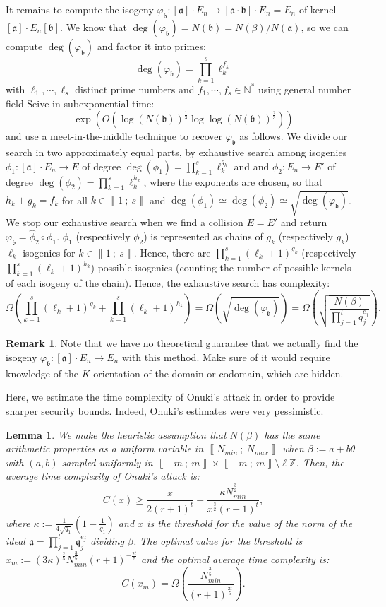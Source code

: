 \documentclass[a4paper,10pt,notitlepage]{report}
\theoremstyle{definition}
\theoremstyle{plain}
\newtheorem{Lemma}[Definition]{Lemma}
\theoremstyle{definition}
\newtheorem{Remark}[Definition]{Remark}
\newcommand{\N}{\mathbb{N}}
\newcommand{\Z}{\mathbb{Z}}
\renewcommand{\i}[2]{\left\llbracket #1~;~#2\right\rrbracket}
\renewcommand{\(}{\left(}
\renewcommand{\)}{\right)}
\newcommand{\mf}[1]{\mathfrak{#1}}
\begin{document}
It remains to compute the isogeny $\varphi_{\mf{b}}:[\mf{a}]\cdot E_n\longrightarrow [\mf{a}\cdot\mf{b}]\cdot E_n=E_n$ of kernel $[\mf{a}]\cdot E_n[\mf{b}]$.  We know that $\deg(\varphi_{\mf{b}})=N(\mf{b})=N(\beta)/N(\mf{a})$, so we can compute $\deg(\varphi_{\mf{b}})$ and factor it into primes:
\[\deg(\varphi_{\mf{b}})=\prod_{k=1}^s\ell_k^{f_k}\]
with $\ell_1,\cdots, \ell_s$ distinct prime numbers and $f_1,\cdots, f_s\in\N^*$ using general number field Seive in subexponential time:
\[\exp\(O\(\log(N(\mf{b}))^{\frac{1}{3}}\log\log(N(\mf{b}))^{\frac{2}{3}}\)\)\] 
and use a meet-in-the-middle technique to recover $\varphi_{\mf{b}}$ as follows. We divide our search in two approximately equal parts, by exhaustive search among isogenies $\phi_1 : [\mf{a}]\cdot E_n\longrightarrow E$ of degree $\deg(\phi_1)=\prod_{k=1}^s\ell_k^{g_k}$ and and $\phi_2 : E_n\longrightarrow E'$ of degree $\deg(\phi_2)=\prod_{k=1}^s\ell_k^{h_k}$, where the exponents are chosen, so that $h_k+g_k=f_k$ for all $k\in\i{1}{s}$ and $\deg(\phi_1)\simeq\deg(\phi_2)\simeq\sqrt{\deg(\varphi_{\mf{b}})}$. We stop our exhaustive search when we find a collision $E=E'$ and return $\varphi_{\mf{b}}=\widehat{\phi}_2\circ\phi_1$. $\phi_1$ (respectively $\phi_2$) is represented as chains of $g_k$ (respectively $g_k$) $\ell_k$-isogenies for $k\in\i{1}{s}$. Hence, there are $\prod_{k=1}^s(\ell_k+1)^{g_k}$ (respectively $\prod_{k=1}^s(\ell_k+1)^{h_k}$) possible isogenies (counting the number of possible kernels of each isogeny of the chain). Hence, the exhaustive search has complexity:
\[\Omega\(\prod_{k=1}^s(\ell_k+1)^{g_k}+\prod_{k=1}^s(\ell_k+1)^{h_k}\)=\Omega(\sqrt{\deg(\varphi_{\mf{b}})})=\Omega\(\sqrt{\frac{N(\beta)}{\prod_{j=1}^t q_j^{e_j}}}\).\]

\begin{Remark}
Note that we have no theoretical guarantee that we actually find the isogeny $\varphi_{\mf{b}}:[\mf{a}]\cdot E_n\longrightarrow E_n$ with this method. Make sure of it would require knowledge of the $K$-orientation of the domain or codomain, which are hidden.
\end{Remark} 

Here, we estimate the time complexity of Onuki's attack in order to provide sharper security bounds. Indeed, Onuki's estimates were very pessimistic.

\begin{Lemma}
We make the heuristic assumption that $N(\beta)$ has the same arithmetic properties as a uniform variable in $\i{N_{min}}{N_{max}}$ when $\beta:=a+b\theta$ with $(a,b)$ sampled uniformly in $\i{-m}{m}\times\i{-m}{m}\setminus\ell\Z$. Then, the average time complexity of Onuki's attack \cite[§ 6.3]{Onuki} is:
\[C(x)\geq \frac{x}{2(r+1)^t}+\frac{\kappa N_{min}^{\frac{3}{2}}}{x^{\frac{3}{2}}(r+1)^t},\]
where $\kappa:=\frac{1}{4\sqrt{q_1}}\(1-\frac{1}{q_1}\)$ and $x$ is the threshold for the value of the norm of the ideal $\mf{a}=\prod_{j=1}^t\mf{q}_j^{e_j}$ dividing $\beta$. The optimal value for the threshold is $x_m:=(3\kappa)^{\frac{2}{5}}N_{min}^{\frac{3}{5}}(r+1)^{-\frac{2t}{5}}$ and the optimal average time complexity is: 
\[C(x_m)=\Omega\(\frac{N_{min}^{\frac{3}{5}}}{(r+1)^{\frac{2t}{5}}}\).\]
\end{Lemma}
\end{document}
